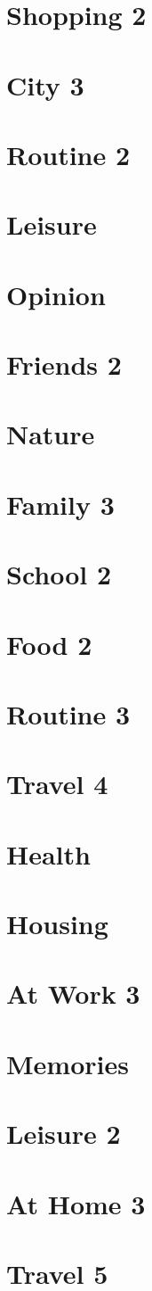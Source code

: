 \documentclass[a4paper,11pt,oneside]{book}
\begin{document}
\section{Shopping 2}
\section{City 3}
\section{Routine 2}
\section{Leisure}
\section{Opinion}
\section{Friends 2}
\section{Nature}
\section{Family 3}
\section{School 2}
\section{Food 2}
\section{Routine 3}
\section{Travel 4}
\section{Health}
\section{Housing}
\section{At Work 3}
\section{Memories}
\section{Leisure 2}
\section{At Home 3}
\section{Travel 5}
\end{document}

